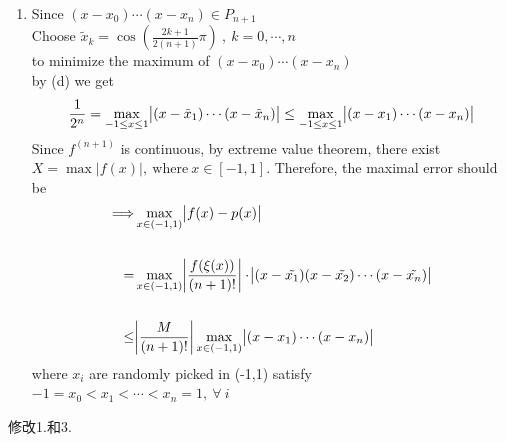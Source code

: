\documentclass[12pt]{article}
\begin{document}
\begin{enumerate}
\begin{enumerate}
            \item %
            Since $(x-x_0)\cdots(x-x_n)\in P_{n+1}$\\
            Choose $\tilde{x}_k=\cos(\frac{2k+1}{2(n+1)}\pi)\ ,\ k=0,\cdots,n$\\ 
            to minimize the maximum of $(x-x_0)\cdots(x-x_n)$\\
            by (d) we get\\
            \begin{equation*}
                \frac{1}{2^n}=\max_{-1\le x\le 1}\abs{(x-\tilde{x}_1)\cdots(x-\tilde{x}_n)}\le \max_{-1\le x\le 1}\abs{(x-x_1)\cdots(x-x_n)}
            \end{equation*}
           Since $f^{(n+1)}$ is continuous, by extreme value theorem, there exist $X= \max |f(x)|,~\text{where}~ x \in [-1,1]$. Therefore, the maximal error should be
           \begin{align*}
           \Longrightarrow &\max_{x\in(-1,1)}\abs{f(x)-p(x)} \\\\
           =&\max_{x\in(-1,1)}\abs{\dfrac{f(\xi(x))}{(n+1)!}}\cdot\abs{(x-\tilde{x_1})(x-\tilde{x_2})\cdots(x-\tilde{x_n})}\\\\
           \leq &\abs{\dfrac{M}{(n+1)!}}\max_{x\in(-1,1)}\abs{(x-x_1)\cdots (x-x_n)}
           \end{align*}
           where $x_i$ are randomly picked in (-1,1) satisfy $-1=x_0<x_1<\cdots<x_n=1,~\forall~i$
        \end{enumerate}
\end{enumerate}
修改1.和3.
\end{document}
